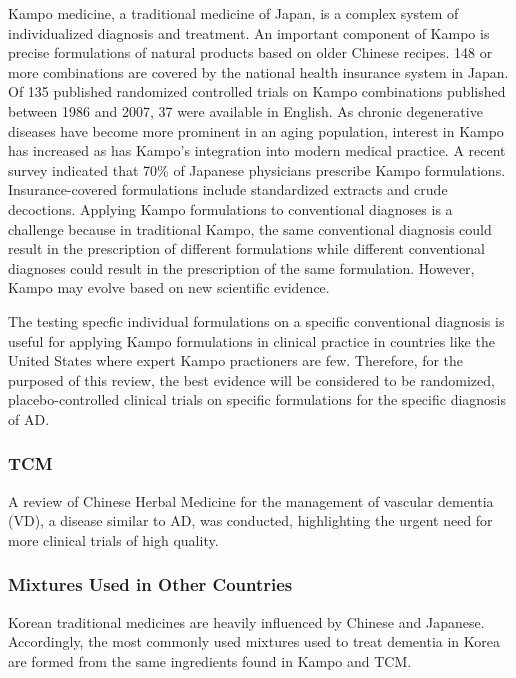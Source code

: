 \documentclass[twocolumn]{article}
\begin{document}
Kampo medicine, a traditional medicine of Japan,
is a complex system of individualized diagnosis and treatment.
An important component of Kampo is precise formulations of natural products
based on older Chinese recipes.
148 or more combinations are covered by the national health insurance system in Japan.
Of 135 published randomized controlled trials on Kampo combinations
published between 1986 and 2007,
37 were available in English.
As chronic degenerative diseases have become more prominent in an aging population,
interest in Kampo has increased as has Kampo's integration into modern medical practice.
A recent survey indicated that 70\% of Japanese physicians prescribe Kampo formulations.
Insurance-covered formulations include standardized extracts and crude decoctions.
Applying Kampo formulations to conventional diagnoses is a challenge because
in traditional Kampo, the same conventional diagnosis could result in the prescription
of different formulations while different conventional diagnoses could result
in the prescription of the same formulation.
\cite{watanabe2011traditional}
However, Kampo may evolve based on new scientific evidence.
\cite{terasawa2004evidence}

The testing specfic individual formulations on a specific conventional diagnosis
is useful for applying Kampo formulations in clinical practice in
countries like the United States where expert Kampo practioners are few.
Therefore, for the purposed of this review, the best evidence will be considered
to be randomized, placebo-controlled clinical trials on specific formulations
for the specific diagnosis of AD.

\subsubsection{TCM}

A review of Chinese Herbal Medicine for the management of vascular dementia (VD),
a disease similar to AD,
was conducted, highlighting the urgent need for more clinical trials of high quality.
\cite{liu2008development}

\subsubsection{Mixtures Used in Other Countries}


Korean traditional medicines are heavily influenced
by Chinese and Japanese. Accordingly,
the most commonly used mixtures used to treat dementia
in Korea are formed from the same ingredients found in
Kampo and TCM.
\cite{jo2014tendency}
\end{document}
